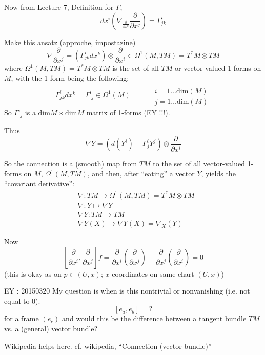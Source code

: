 Now from Lecture 7, Definition for $\Gamma$, 
\[
dx^i \left( \nabla_{ \frac{  \partial }{ \partial x^k } } \frac{ \partial }{ \partial x^j } \right) = \Gamma^i_{jk}
\]

Make this ansatz (approche, impostazine)
\[
\nabla \frac{ \partial}{ \partial x^j } = \left( \Gamma^i_{jk} dx^k \right) \otimes \frac{ \partial }{ \partial x^i} \in \Omega^1(M,TM) = T^*M \otimes TM
\]
where $\Omega^1(M,TM) = T^*M \otimes TM$ is the set of all $TM$ or vector-valued 1-forms on $M$, with the 1-form being the following:
\[
\Gamma^i_{jk} dx^k = \Gamma^i_{ \, \, j } \in \Omega^1(M) \quad \quad \, \begin{aligned}
  & \quad \\
  & i = 1 \dots \text{dim}(M) \\ 
  & j = 1\dots \text{dim}(M) \end{aligned}
\]
So $\Gamma^i_{ \, \, j}$ is a $\text{dim}M \times \text{dim}M$ matrix of 1-forms (EY !!!). 

Thus
\[
\nabla Y = (d(Y^i) + \Gamma^i_j Y^j ) \otimes \frac{ \partial }{ \partial x^i}
\]

So the connection is a (smooth) map from $TM$ to the set of all vector-valued 1-forms on $M$, $\Omega^1(M,TM)$, and then, after ``eating'' a vector $Y$, yields the ``covariant derivative'':
\[
\begin{aligned}
  & \nabla: TM \to \Omega^1(M,TM) = T^*M \otimes TM \\ 
  & \nabla : Y \mapsto \nabla Y \\ 
  & \nabla Y : TM \to TM \\
  & \nabla Y(X) \mapsto \nabla Y(X) = \nabla_X(Y)
\end{aligned}
\]

Now
\[
\left[ \frac{ \partial }{ \partial x^i} , \frac{ \partial }{ \partial x^j} \right] f = \frac{ \partial }{ \partial x^i } \left( \frac{ \partial }{ \partial x^j} \right) - \frac{ \partial }{ \partial x^j } \left( \frac{ \partial }{ \partial x^i} \right) = 0 
\]
(this is okay as on $p \in (U,x)$; $x$-coordinates on same chart $(U,x)$)

EY : 20150320 My question is when is this nontrivial or nonvanishing (i.e. not equal to $0$).
\[
[e_a,e_b] = ?
\]
for a frame $(e_c)$ and would this be the difference between a tangent bundle $TM$ vs. a (general) vector bundle?

Wikipedia helps here. cf. wikipedia, ``Connection (vector bundle)''

